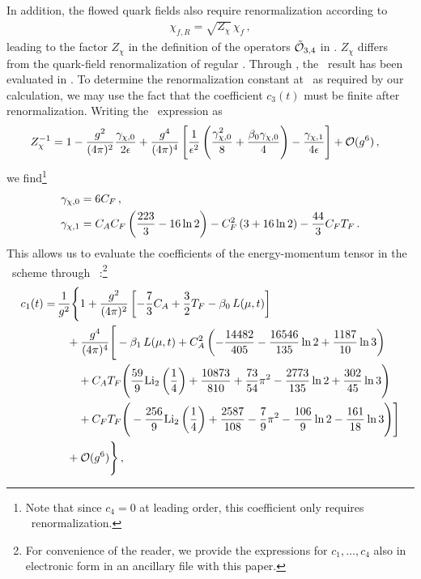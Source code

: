 In addition, the flowed quark fields also require renormalization
according to
\begin{equation}
  \begin{split}
    \chi_{f,R} = \sqrt{Z_\chi}\,\chi_{f}\,,
  \end{split}
\end{equation}
leading to the factor $Z_\chi$ in the definition of the operators
$\tilde{\mathcal{O}}_{3,4}$ in .  $Z_\chi$ differs from the quark-field
renormalization of regular \qcd.
Through \nlo, the \msbar\ result has been evaluated in
. To determine the renormalization constant at
\nnlo\ as required by our calculation, we may use the fact that the
coefficient $c_3(t)$ must be finite after renormalization. Writing the
\msbar\ expression as
\begin{equation}
  \begin{split}
    Z^{-1}_\chi &=
    1
      -\gcoup{2}\frac{\gamma_{\chi,0}}{2\ep}
      +\gcoup{4}\left[\frac{1}{\ep^2}\left(
        \frac{\gamma_{\chi,0}^2}{8} +
        \frac{\beta_0\gamma_{\chi,0}}{4}\right)
        -\frac{\gamma_{\chi,1}}{4\ep}\right] + \order{g^6}\,,
    \label{eq:zchi}
  \end{split}
\end{equation}
we find\footnote{Note that since $c_4=0$ at leading
  order, this coefficient only requires \nlo\ renormalization.}
\begin{equation}
  \begin{split}
  \gamma_{\chi,0} &= 6C_F\,,\\
  \gamma_{\chi, 1} &=
  C_A C_F \left( \frac{223}{3} - 16 \ln 2 \right) - C_F^2 \left( 3 + 16
  \ln 2 \right) - \frac{44}{3} C_F T_F\,.
  \end{split}
\end{equation}
This allows us to evaluate the coefficients of the energy-momentum
tensor in the \msbar\ scheme through \nnlo\ \qcd:\footnote{For
  convenience of the reader, we provide the expressions for
  $c_1,\ldots,c_4$ also in electronic form in an ancillary file with
  this paper.}
\begin{equation}
  \begin{split}
    c_1(t) =& \, \frac{1}{g^2} \Bigg\{ 1 + \gcoup{2}
    \left[ - \frac{7}{3}  C_A + \frac{3}{2}
      \TF -  \beta _0 \, L (\mu, t) \right] \\
	& \quad + \gcoup{4} \Bigg[ - \beta_1 \, L
      (\mu, t) + C_A^2 \left( - \frac{14482}{405} - \frac{16546}{135}
      \ln 2 + \frac{1187}{10} \ln 3 \right) \\
      & \qquad + C_A \TF \Bigg( \frac{59}{9}
      \text{Li}_2\left(\frac{1}{4}\right) + \frac{10873}{810} +
      \frac{73}{54} \pi^2 - \frac{2773}{135} \ln 2 + \frac{302}{45} \ln
      3 \Bigg) \\
	& \qquad + C_F \TF \Bigg( - \frac{256}{9}
      \text{Li}_2\left(\frac{1}{4}\right) +\frac{2587}{108} -
      \frac{7}{9} \pi^2 - \frac{106}{9} \ln 2 - \frac{161}{18} \ln 3
      \Bigg) \Bigg] \\
    & \quad + \order{g^6} \Bigg\} \, ,
    \label{eq:c1}
  \end{split}
\end{equation}
